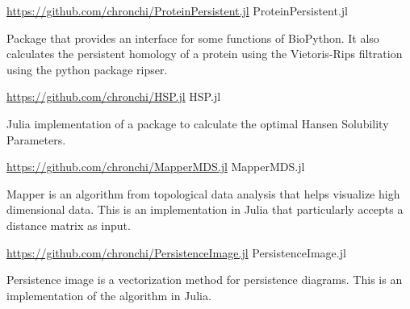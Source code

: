 

\begin{cventries}

\cventry
  {\url{https://github.com/chronchi/ProteinPersistent.jl}} %
  {ProteinPersistent.jl} %
  {}{}
  {
    \begin{cvitems} %
      \item {Package that provides an interface for some functions of BioPython.
      It also calculates the persistent homology of a protein using the
      Vietoris-Rips filtration using the python package ripser.}
    \end{cvitems}
  }

\cventry
  {\url{https://github.com/chronchi/HSP.jl}} %
  {HSP.jl} %
  {}{}
  {
    \begin{cvitems} %
      \item {Julia implementation of a package to calculate the
      optimal Hansen Solubility Parameters.}
    \end{cvitems}
  }

\cventry
  {\url{https://github.com/chronchi/MapperMDS.jl}} %
  {MapperMDS.jl} %
  {}{}
  {
    \begin{cvitems} %
      \item {Mapper is an algorithm from topological data analysis that
      helps visualize high dimensional data. This is
      an implementation in Julia that particularly accepts a distance matrix
      as input.}
    \end{cvitems}
  }

\cventry
  {\url{https://github.com/chronchi/PersistenceImage.jl}} %
  {PersistenceImage.jl} %
  {}{}
  {
    \begin{cvitems} %
      \item {Persistence image is a vectorization method for persistence
      diagrams. This is an implementation of the algorithm in Julia.}
    \end{cvitems}
  }

\end{cventries}
